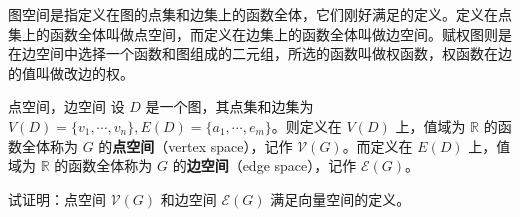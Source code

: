 
图空间是指定义在图的点集和边集上的函数全体，它们刚好满足的定义。定义在点集上的函数全体叫做点空间，而定义在边集上的函数全体叫做边空间。赋权图则是在边空间中选择一个函数和图组成的二元组，所选的函数叫做权函数，权函数在边的值叫做改边的权。

\begin{definition}{点空间，边空间}
设 $D$ 是一个图，其点集和边集为 $V(D)=\{v_1,\cdots,v_n\},E(D)=\{a_1,\cdots,e_m\}$。则定义在 $V(D)$ 上，值域为 $\mathbb R$ 的函数全体称为 $G$ 的\textbf{点空间}（vertex space），记作 $\mathcal V(G)$。而定义在 $E(D)$ 上，值域为 $\mathbb R$ 的函数全体称为 $G$ 的\textbf{边空间}（edge space），记作 $\mathcal E(G)$。
\end{definition}


\begin{exercise}{}
试证明：点空间 $\mathcal V(G)$ 和边空间 $\mathcal E(G)$ 满足向量空间的定义。
\end{exercise}










